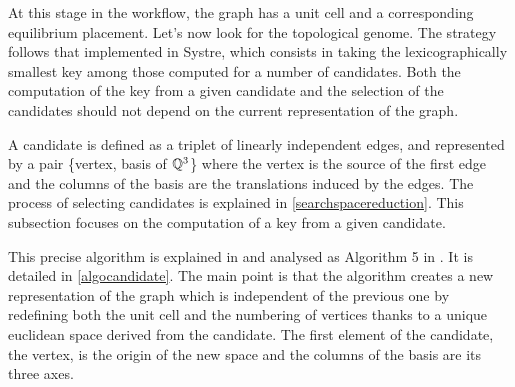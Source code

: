 \documentclass[main.tex]{subfiles}
\begin{document}
At this stage in the workflow, the graph has a unit cell and a corresponding equilibrium placement. Let's now look for the topological genome. The strategy follows that implemented in Systre, which consists in taking the lexicographically smallest key among those computed for a number of candidates. Both the computation of the key from a given candidate and the selection of the candidates should not depend on the current representation of the graph.

A candidate is defined as a triplet of linearly independent edges, and represented by a pair \{vertex, basis of $\mathbb{Q}^3$\} where the vertex is the source of the first edge and the columns of the basis are the translations induced by the edges. The process of selecting candidates is explained in \autoref{searchspacereduction}. This subsection focuses on the computation of a key from a given candidate.\\

\label{searchspaceexploration}

This precise algorithm is explained in \autocite{Systre} and analysed as Algorithm 5 in \autocite{barycentric}. It is detailed in \autoref{algocandidate}. The main point is that the algorithm creates a new representation of the graph which is independent of the previous one by redefining both the unit cell and the numbering of vertices thanks to a unique euclidean space derived from the candidate. The first element of the candidate, the vertex, is the origin of the new space and the columns of the basis are its three axes.
\end{document}
